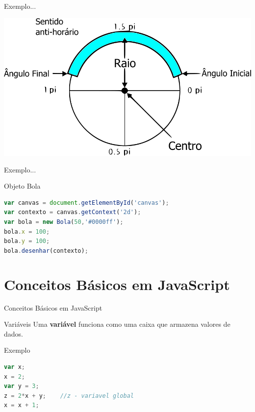 \documentclass[xcolor=dvipsnames,table]{beamer}
\begin{document}
\begin{frame}{Exemplo...}
	\begin{center}
		\includegraphics[scale=0.4]{images/arc.png}
	\end{center}
\end{frame}

\begin{frame}[fragile]{Exemplo...}
	\begin{block}{Objeto Bola}
		\begin{lstlisting}[language=JavaScript]
var canvas = document.getElementById('canvas');
var contexto = canvas.getContext('2d');
var bola = new Bola(50,'#0000ff');
bola.x = 100;
bola.y = 100;
bola.desenhar(contexto);
\end{lstlisting}	
	\end{block}
\end{frame}

\section{Conceitos Básicos em JavaScript}
\begin{frame}[fragile]{Conceitos Básicos em JavaScript}
	\begin{block}{Variáveis}
		Uma {\bf variável} funciona como uma caixa que armazena valores de dados.
	\end{block} \pause
	\begin{block}{Exemplo}
		\begin{lstlisting}[language=JavaScript]
var x;
x = 2;
var y = 3;
z = 2*x + y;	//z - variavel global
x = x + 1;
\end{lstlisting}	
	\end{block}
\end{frame}
\end{document}
